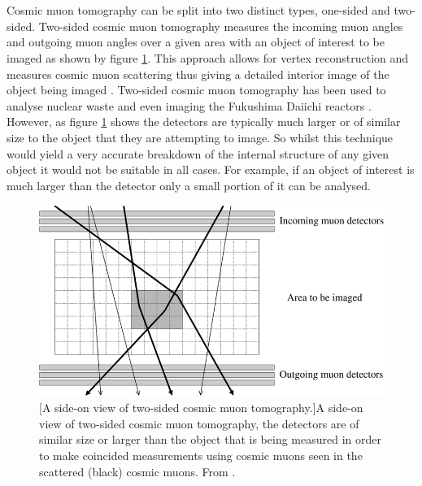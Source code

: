\\\\Cosmic muon tomography can be split into two distinct types, one-sided and two-sided. Two-sided cosmic muon tomography measures the incoming muon angles and outgoing muon angles over a given area with an object of interest to be imaged as shown by figure \ref{fig:twoSidedCosmicMuonTomographySchults}. This approach allows for vertex reconstruction and measures cosmic muon scattering thus giving a detailed interior image of the object being imaged \cite{schultz_2007}. Two-sided cosmic muon tomography has been used to analyse nuclear waste \cite{jonkmans2013nuclear} and even imaging the Fukushima Daiichi reactors \cite{miyadera2013imaging}. However, as figure \ref{fig:twoSidedCosmicMuonTomographySchults} shows the  detectors are typically much larger or of similar size to the object that they are attempting to image. So whilst this technique would yield a very accurate breakdown of the internal structure of any given object it would not be suitable in all cases. For example, if an object of interest is much larger than the detector only a small portion of it can be analysed. 

\begin{figure}[!h]
 \centering
 \includegraphics[width=0.7\linewidth]{Chapter5/Figs/Raster/twoSidedCosmicMuon_schults2007.png}
 [A side-on view of two-sided cosmic muon tomography.]{A side-on view of two-sided cosmic muon tomography, the detectors are of similar size or larger than the object that is being measured in order to make coincided measurements using cosmic muons seen in the scattered (black) cosmic muons. From \cite{schultz_2007}.}
 \label{fig:twoSidedCosmicMuonTomographySchults}
\end{figure}
 
 

